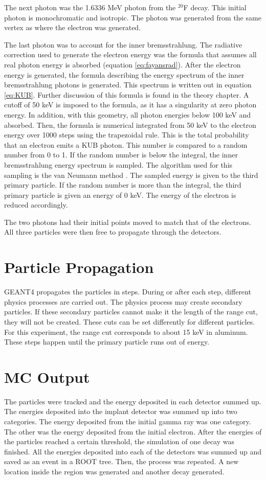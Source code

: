 \documentclass[../main.tex]{subfiles}
\begin{document}
The next photon was the 1.6336 MeV photon from the $^{20}$F decay.
This initial photon is monochromatic and isotropic.
The photon was generated from the same vertex as where the electron was generated.

The last photon was to account for the inner bremsstrahlung.
The radiative correction used to generate the electron energy was the formula that assumes all real photon energy is absorbed (equation \ref{eq:fayansrad}).
After the electron energy is generated, the formula describing the energy spectrum of the inner bremsstrahlung photons is generated. 
This spectrum is written out in equation \ref{eq:KUB}. %
Further discussion of this formula is found in the theory chapter.
A cutoff of 50 keV is imposed to the formula, as it has a singularity at zero photon energy.
In addition, with this geometry, all photon energies below 100 keV and absorbed.
Then, the formula is numerical integrated from 50 keV to the electron energy over 1000 steps using the trapezoidal rule.
This is the total probability that an electron emits a KUB photon.
This number is compared to a random number from 0 to 1.
If the random number is below the integral, the inner bremsstrahlung energy spectrum is sampled.
The algorithm used for this sampling is the van Neumann method \cite{neu51}.
The sampled energy is given to the third primary particle.
If the random number is more than the integral, the third primary particle is given an energy of 0 keV.
The energy of the electron is reduced accordingly.

The two photons had their initial points moved to match that of the electrons.
All three particles were then free to propagate through the detectors.

\section{Particle Propagation}  
GEANT4 propagates the particles in steps.
During or after each step, different physics processes are carried out.
The physics process may create secondary particles.
If these secondary particles cannot make it the length of the range cut, they will not be created.
These cuts can be set differently for different particles.
For this experiment, the range cut corresponds to about 15 keV in aluminum.
These steps happen until the primary particle runs out of energy.

\section{MC Output}
The particles were tracked and the energy deposited in each detector summed up.
The energies deposited into the implant detector was summed up into two categories.
The energy deposited from the initial gamma ray was one category.
The other was the energy deposited from the initial electron.
After the energies of the particles reached a certain threshold, the simulation of one decay was finished.
All the energies deposited into each of the detectors was summed up and saved as an event in a ROOT tree.
Then, the process was repeated.
A new location inside the region was generated and another decay generated.
\end{document}
